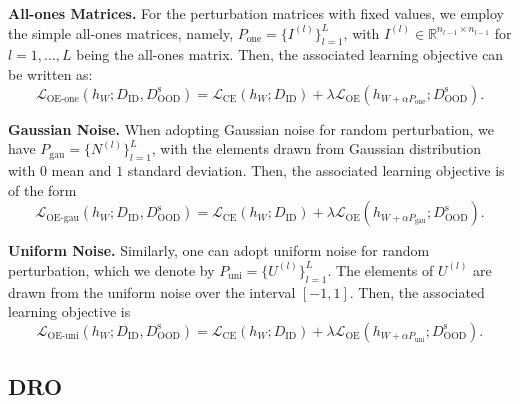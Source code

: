 \documentclass{article} \usepackage{iclr2022_conference,times}
\begin{document}
\textbf{All-ones Matrices.} For the perturbation matrices with fixed values, we employ the simple all-ones matrices, namely, $P_\text{one}=\{I^{(l)}\}_{l=1}^L$, with $I^{(l)}\in\mathbb{R}^{n_{l-1}\times n_{l-1}}$ for $l=1,\ldots,L$ being the all-ones matrix. Then, the associated learning objective can be written as:
\begin{equation}
    \mathcal{L}_\text{OE-one}(h_{W}; D_\text{ID}, D^\text{s}_\text{OOD})= {\mathcal{L}}_\text{CE} (h_W;   D_\text{ID}) +\lambda \mathcal{L}_\text{OE}(h_{W+ \alpha P_\text{one}}; D^\text{s}_\text{OOD}). 
\end{equation}

\textbf{Gaussian Noise.} When adopting Gaussian noise for random perturbation, we have $P_\text{gau}=\{N^{(l)}\}_{l=1}^L$, with the elements drawn from Gaussian distribution with $0$ mean and $1$ standard deviation. Then, the associated learning objective is of the form
\begin{equation}
    \mathcal{L}_\text{OE-gau}(h_{W}; D_\text{ID}, D^\text{s}_\text{OOD})= {\mathcal{L}}_\text{CE} (h_W;   D_\text{ID}) +\lambda \mathcal{L}_\text{OE}(h_{W+ \alpha P_\text{gau}}; D^\text{s}_\text{OOD}). 
\end{equation}

\textbf{Uniform Noise.} Similarly, one can adopt uniform noise for random perturbation, which we denote by $P_\text{uni}=\{U^{(l)}\}_{l=1}^L$. The elements of $U^{(l)}$ are drawn from the uniform noise over the interval $[-1,1]$. Then, the associated learning objective is 
\begin{equation}
    \mathcal{L}_\text{OE-uni}(h_{W}; D_\text{ID}, D^\text{s}_\text{OOD})= {\mathcal{L}}_\text{CE} (h_W;   D_\text{ID}) +\lambda \mathcal{L}_\text{OE}(h_{W+ \alpha P_\text{uni}}; D^\text{s}_\text{OOD}). 
\end{equation}
 






\subsection{DRO}
\label{sec: dro}
\end{document}
